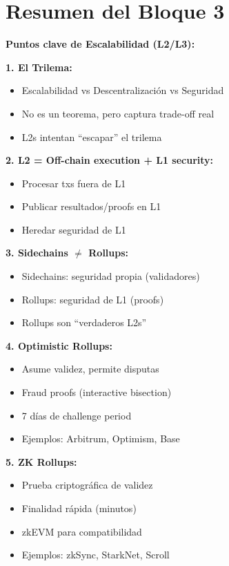 \documentclass[11pt,a4paper,twoside,openright]{book}
\theoremstyle{definition}
\theoremstyle{plain}
\theoremstyle{remark}
\begin{document}
\section{Resumen del Bloque 3}

\begin{keyidea}
\textbf{Puntos clave de Escalabilidad (L2/L3):}

\textbf{1. El Trilema:}
\begin{itemize}
    \item Escalabilidad vs Descentralización vs Seguridad
    \item No es un teorema, pero captura trade-off real
    \item L2s intentan ``escapar'' el trilema
\end{itemize}

\textbf{2. L2 = Off-chain execution + L1 security:}
\begin{itemize}
    \item Procesar txs fuera de L1
    \item Publicar resultados/proofs en L1
    \item Heredar seguridad de L1
\end{itemize}

\textbf{3. Sidechains $\neq$ Rollups:}
\begin{itemize}
    \item Sidechains: seguridad propia (validadores)
    \item Rollups: seguridad de L1 (proofs)
    \item Rollups son ``verdaderos L2s''
\end{itemize}

\textbf{4. Optimistic Rollups:}
\begin{itemize}
    \item Asume validez, permite disputas
    \item Fraud proofs (interactive bisection)
    \item 7 días de challenge period
    \item Ejemplos: Arbitrum, Optimism, Base
\end{itemize}

\textbf{5. ZK Rollups:}
\begin{itemize}
    \item Prueba criptográfica de validez
    \item Finalidad rápida (minutos)
    \item zkEVM para compatibilidad
    \item Ejemplos: zkSync, StarkNet, Scroll
\end{itemize}


\end{keyidea}
\end{document}
